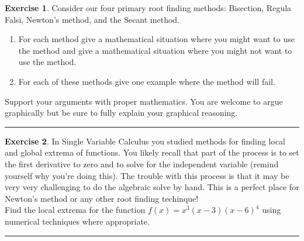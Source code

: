 \documentclass[
]{book}
\theoremstyle{definition}
\theoremstyle{definition}
\theoremstyle{definition}
\newtheorem{exercise}{Exercise}[chapter]
\theoremstyle{remark}
\begin{document}
\begin{exercise}
\protect\hypertarget{exr:unnamed-chunk-128}{}{\label{exr:unnamed-chunk-128} }Consider our four primary root finding methods: Bisection, Regula Falsi,
Newton's method, and the Secant method.

\begin{enumerate}
\def\labelenumi{\alph{enumi}.}
\item
  For each method give a mathematical situation where you might want
  to use the method and give a mathematical situation where you might
  not want to use the method.
\item
  For each of these methods give one example where the method will
  fail.
\end{enumerate}

Support your arguments with proper mathematics. You are welcome to argue
graphically but be sure to fully explain your graphical reasoning.
\end{exercise}

\begin{center}\rule{0.5\linewidth}{0.5pt}\end{center}

\begin{exercise}
\protect\hypertarget{exr:unnamed-chunk-129}{}{\label{exr:unnamed-chunk-129} }In Single Variable Calculus you studied methods for finding local and
global extrema of functions. You likely recall that part of the process
is to set the first derivative to zero and to solve for the independent
variable (remind yourself why you're doing this). The trouble with this
process is that it may be very very challenging to do the algebraic
solve by hand. This is a perfect place for Newton's method or any other
root finding techinque!\\
Find the local extrema for the function \(f(x) = x^3(x-3)(x-6)^4\) using numerical techniques where appropriate.
\end{exercise}

\begin{center}\rule{0.5\linewidth}{0.5pt}\end{center}
\end{document}
